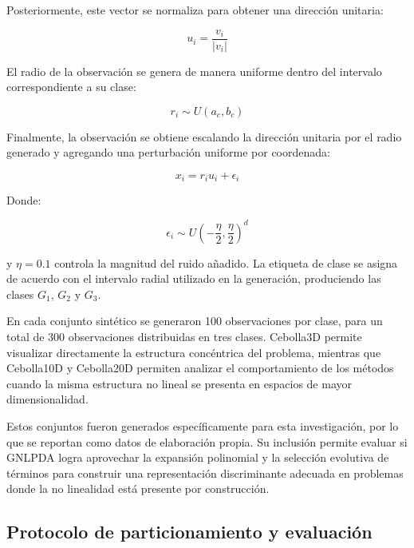 Posteriormente, este vector se normaliza para obtener una dirección unitaria:

\begin{equation}
	u_i = \frac{v_i}{|v_i|}	
	\label{eq:EM17}
\end{equation}

El radio de la observación se genera de manera uniforme dentro del intervalo correspondiente a su clase:

\begin{equation}
	r_i \sim U(a_c,b_c)	
	\label{eq:EM18}
\end{equation}

Finalmente, la observación se obtiene escalando la dirección unitaria por el radio generado y agregando una perturbación uniforme por coordenada:

\begin{equation}
	x_i = r_iu_i + \epsilon_i	
	\label{eq:EM19}
\end{equation}

Donde:

\begin{equation}
	\epsilon_i \sim U\left(-\frac{\eta}{2}, \frac{\eta}{2}\right)^d
	\label{eq:EM20}
\end{equation}

y $\eta = 0.1$ controla la magnitud del ruido añadido. La etiqueta de clase se asigna de acuerdo con el intervalo radial utilizado en la generación, produciendo las clases $G_1$, $G_2$ y $G_3$.

En cada conjunto sintético se generaron 100 observaciones por clase, para un total de 300 observaciones distribuidas en tres clases. Cebolla3D permite visualizar directamente la estructura concéntrica del problema, mientras que Cebolla10D y Cebolla20D permiten analizar el comportamiento de los métodos cuando la misma estructura no lineal se presenta en espacios de mayor dimensionalidad.

Estos conjuntos fueron generados específicamente para esta investigación, por lo que se reportan como datos de elaboración propia. Su inclusión permite evaluar si GNLPDA logra aprovechar la expansión polinomial y la selección evolutiva de términos para construir una representación discriminante adecuada en problemas donde la no linealidad está presente por construcción.

\subsection{Protocolo de particionamiento y evaluación}

